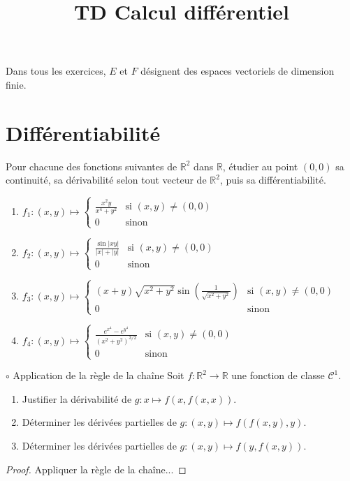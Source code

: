 \documentclass[french,a4paper]{article}
\title{TD Calcul différentiel}
\newcommand{\R}{\mathbb{R}}
\theoremstyle{plain}
\theoremstyle{definition}
\theoremstyle{remark}
\begin{document}
\maketitle

Dans tous les exercices, $E$ et $F$ désignent des espaces vectoriels de dimension finie.

\section{Différentiabilité}

\begin{ex}[Moulin.01]{}
	Pour chacune des fonctions suivantes de $\R^2$ dans $\R$, étudier au point $(0,0)$ sa continuité, sa dérivabilité selon tout vecteur de $\R^2$, puis sa différentiabilité.
	\begin{enumerate}
		\item $\displaystyle f_1:(x,y)\mapsto\begin{cases}
			\displaystyle\frac{x^2y}{x^4+y^2}&\text{si }(x,y)\ne(0,0)\\
			0&\text{sinon}
		\end{cases}$
		\item $\displaystyle f_2:(x,y)\mapsto\begin{cases}
			\displaystyle\frac{\sin\lvert xy\rvert}{\lvert x\rvert+\lvert y\rvert}&\text{si }(x,y)\ne(0,0)\\
			0&\text{sinon}
		\end{cases}$
		\item $\displaystyle f_3:(x,y)\mapsto\begin{cases}
			\displaystyle(x+y)\sqrt{x^2+y^2}\sin\left(\frac{1}{\sqrt{x^2+y^2}}\right)&\text{si }(x,y)\ne(0,0)\\
			0&\text{sinon}
		\end{cases}$
		\item $\displaystyle f_4:(x,y)\mapsto\begin{cases}
			\displaystyle\frac{e^{x^4}-e^{y^4}}{(x^2+y^2)^{3/2}}&\text{si }(x,y)\ne(0,0)\\
			0&\text{sinon}
		\end{cases}$
	\end{enumerate}
\end{ex}

\begin{ex}[Moulin.02]{$\circ$ Application de la règle de la chaîne}
	Soit $f:\R^2\to\R$ une fonction de classe $\mathcal{C}^1$.
	\begin{enumerate}
		\item Justifier la dérivabilité de $g:x\mapsto f(x,f(x,x))$.
		\item Déterminer les dérivées partielles de $g:(x,y)\mapsto f(f(x,y),y)$.
		\item Déterminer les dérivées partielles de $g:(x,y)\mapsto f(y,f(x,y))$.
	\end{enumerate}
\end{ex}
\begin{proof}
	Appliquer la règle de la chaîne...
\end{proof}
\end{document}
